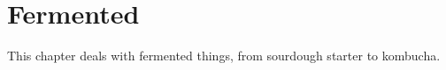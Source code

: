 \chapter{Fermented}
\label{feremented}
This chapter deals with fermented things, from sourdough starter to kombucha.
\clearpage

%
%
%